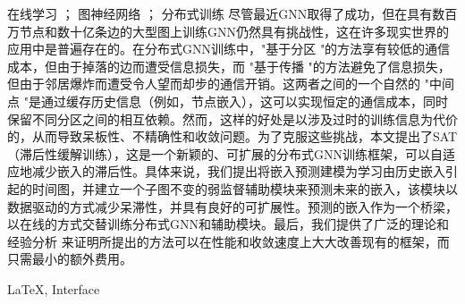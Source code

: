 \begin{中文摘要}{在线学习 ； 图神经网络 ； 分布式训练}
    尽管最近GNN取得了成功，但在具有数百万节点和数十亿条边的大型图上训练GNN仍然具有挑战性，这在许多现实世界的应用中是普遍存在的。在分布式GNN训练中，"基于分区 "的方法享有较低的通信成本，但由于掉落的边而遭受信息损失，而 "基于传播 "的方法避免了信息损失，但由于邻居爆炸而遭受令人望而却步的通信开销。这两者之间的一个自然的 "中间点 "是通过缓存历史信息（例如，节点嵌入），这可以实现恒定的通信成本，同时保留不同分区之间的相互依赖。然而，这样的好处是以涉及过时的训练信息为代价的，从而导致呆板性、不精确性和收敛问题。为了克服这些挑战，本文提出了SAT（滞后性缓解训练），这是一个新颖的、可扩展的分布式GNN训练框架，可以自适应地减少嵌入的滞后性。具体来说，我们提出将嵌入预测建模为学习由历史嵌入引起的时间图，并建立一个子图不变的弱监督辅助模块来预测未来的嵌入，该模块以数据驱动的方式减少呆滞性，并具有良好的可扩展性。预测的嵌入作为一个桥梁，以在线的方式交替训练分布式GNN和辅助模块。最后，我们提供了广泛的理论和经验分析
    来证明所提出的方法可以在性能和收敛速度上大大改善现有的框架，而只需最小的额外费用。
    
  \end{中文摘要}
  
  \begin{英文摘要}{LaTeX, Interface}
    \lipsum[1]
  \end{英文摘要}
  